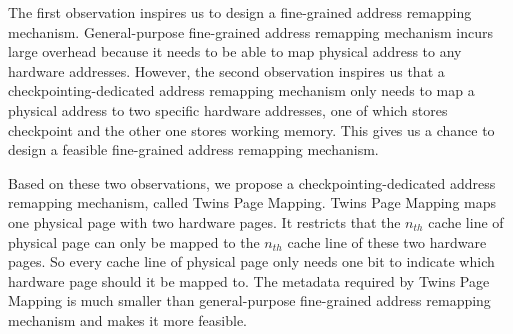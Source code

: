 \documentclass[conference]{IEEEtran}
\begin{document}
The first observation inspires us to design a fine-grained address remapping mechanism.
General-purpose fine-grained address remapping mechanism incurs large overhead because it needs to be able to map physical address to any hardware addresses.
However, the second observation inspires us that a checkpointing-dedicated address remapping mechanism only needs to map a physical address to two specific hardware addresses, one of which stores checkpoint and the other one stores working memory.
This gives us a chance to design a feasible fine-grained address remapping mechanism.



Based on these two observations, we propose a checkpointing-dedicated address remapping mechanism, called Twins Page Mapping.
Twins Page Mapping maps one physical page with two hardware pages.
It restricts that the $n_{th}$ cache line of physical page can only be mapped to the $n_{th}$ cache line of these two hardware pages.
So every cache line of physical page only needs one bit to indicate which hardware page should it be mapped to.
The metadata required by Twins Page Mapping is much smaller than general-purpose fine-grained address remapping mechanism and makes it more feasible.

%
\end{document}
